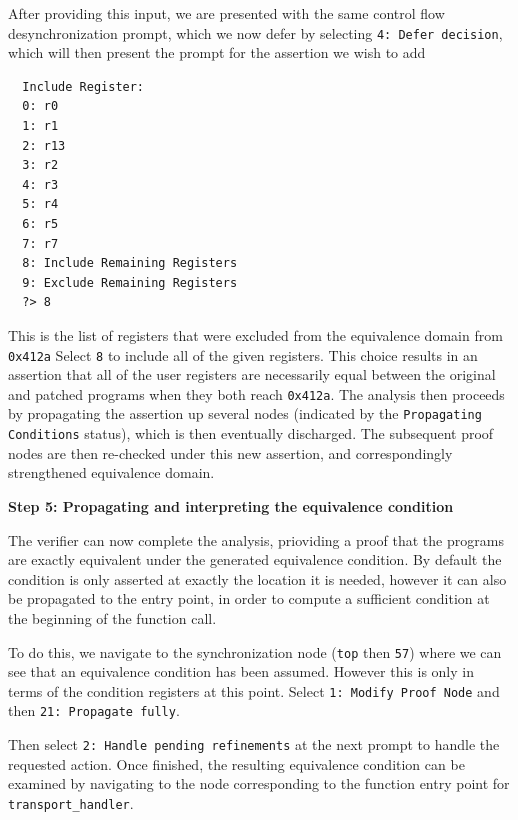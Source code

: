 After providing this input, we are presented with the same control flow desynchronization prompt, which we now defer by selecting \texttt{4: Defer decision}, which will then present the prompt for the assertion we wish to add
\begin{verbatim}
  Include Register:
  0: r0
  1: r1
  2: r13
  3: r2
  4: r3
  5: r4
  6: r5
  7: r7
  8: Include Remaining Registers
  9: Exclude Remaining Registers
  ?> 8
\end{verbatim}

This is the list of registers that were excluded from the equivalence domain from \texttt{0x412a} Select \texttt{8} to include all of the given registers.
This choice results in an assertion that all of the user registers are necessarily equal between the original and patched programs when they both reach \texttt{0x412a}.
The analysis then proceeds by propagating the assertion up several nodes (indicated by the \texttt{Propagating Conditions} status), which is then eventually discharged.
The subsequent proof nodes are then re-checked under this new assertion, and correspondingly strengthened equivalence domain.

\noindent\textbf{Step 5: Propagating and interpreting the equivalence condition}

The verifier can now complete the analysis, prioviding a proof that the programs are exactly equivalent under the generated equivalence condition.
By default the condition is only asserted at exactly the location it is needed, however it can also be propagated to the entry point, in order to compute a sufficient condition at the beginning of the function call.

To do this, we navigate to the synchronization node (\texttt{top} then \texttt{57}) where we can see that an equivalence condition has been assumed.
However this is only in terms of the condition registers at this point.
Select \texttt{1: Modify Proof Node} and then \texttt{21:   Propagate fully}.

Then select \texttt{2: Handle pending refinements} at the next prompt to handle the requested action.
Once finished, the resulting equivalence condition can be examined by navigating to the node corresponding to the function entry point for \texttt{transport\_handler}.

